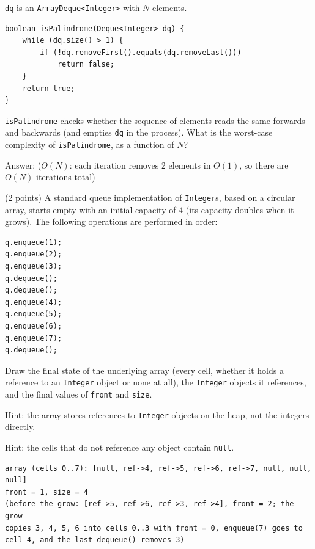 \begin{question}
\lstinline|dq| is an \lstinline|ArrayDeque<Integer>| with $N$ elements.

\begin{lstlisting}
boolean isPalindrome(Deque<Integer> dq) {
    while (dq.size() > 1) {
        if (!dq.removeFirst().equals(dq.removeLast()))
            return false;
    }
    return true;
}
\end{lstlisting}

\lstinline|isPalindrome| checks whether the sequence of elements reads the same forwards and backwards (and empties \lstinline|dq| in the process). What is the worst-case complexity of \lstinline|isPalindrome|, as a function of $N$?

Answer: \underline{\hspace{1in}} \ifanswers ($O(N)$: each iteration removes 2 elements in $O(1)$, so there are $O(N)$ iterations total)\fi
\end{question}

\begin{question}
(2 points) A standard queue implementation of \lstinline|Integer|s, based on a circular array, starts empty with an initial capacity of 4 (its capacity doubles when it grows). The following operations are performed in order:

\begin{lstlisting}
q.enqueue(1);
q.enqueue(2);
q.enqueue(3);
q.dequeue();
q.dequeue();
q.enqueue(4);
q.enqueue(5);
q.enqueue(6);
q.enqueue(7);
q.dequeue();
\end{lstlisting}

Draw the final state of the underlying array (every cell, whether it holds a reference to an \lstinline|Integer| object or none at all), the \lstinline|Integer| objects it references, and the final values of \lstinline|front| and \lstinline|size|.

Hint: the array stores references to \lstinline|Integer| objects on the heap, not the integers directly.

Hint: the cells that do not reference any object contain \lstinline|null|.

\ifanswers
\begin{verbatim}
array (cells 0..7): [null, ref->4, ref->5, ref->6, ref->7, null, null, null]
front = 1, size = 4
(before the grow: [ref->5, ref->6, ref->3, ref->4], front = 2; the grow
copies 3, 4, 5, 6 into cells 0..3 with front = 0, enqueue(7) goes to
cell 4, and the last dequeue() removes 3)
\end{verbatim}
\else
\vspace{2.5in}
\fi
\end{question}

